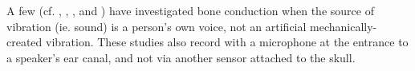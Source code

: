% 
%
A few (cf. \cite{bekesy:48}, \cite{hansen:97b}, \cite{porschmann:00}, and \cite{reinfeldt:10}) have investigated bone conduction when the source of vibration (ie. sound) is a person's own voice, not an artificial mechanically-created vibration.  These studies also record with a microphone at the entrance to a speaker's ear canal, and not via another sensor attached to the skull.

